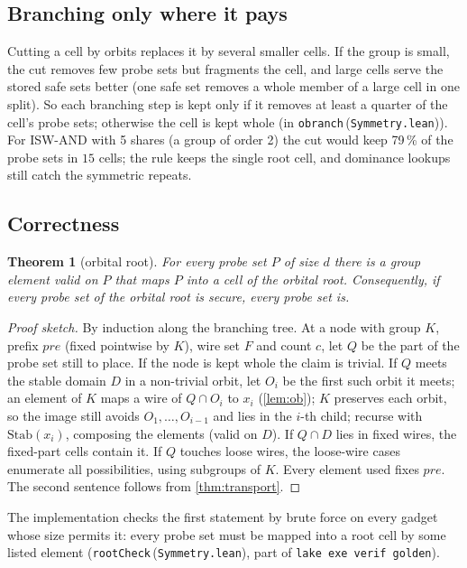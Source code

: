 \documentclass[11pt,a4paper]{article}
\newtheorem{theorem}{Theorem}[section]
\theoremstyle{definition}
\theoremstyle{remark}
\newcommand{\code}[1]{\texttt{\small #1}}
\newcommand{\lean}[2]{\code{#1}\,(\code{#2})}
\newcommand{\Stab}{\mathrm{Stab}}
\begin{document}
\subsection{Branching only where it pays}

Cutting a cell by orbits replaces it by several smaller cells.  If the group is small, the
cut removes few probe sets but fragments the cell, and large cells serve the stored safe sets
better (one safe set removes a whole member of a large cell in one split).  So each branching
step is kept only if it removes at least a quarter of the cell's probe sets; otherwise the
cell is kept whole (in \lean{obranch}{Symmetry.lean}).  For ISW-AND with 5 shares (a group of
order 2) the cut would keep 79\,\% of the probe sets in $15$ cells; the rule keeps the single
root cell, and dominance lookups still catch the symmetric repeats.

\subsection{Correctness}

\begin{theorem}[orbital root]\label{thm:root}
For every probe set $P$ of size $d$ there is a group element valid on $P$ that maps $P$
into a cell of the orbital root.  Consequently, if every probe set of the orbital root is
secure, every probe set is.
\end{theorem}
\begin{proof}[Proof sketch]
By induction along the branching tree.  At a node with group $K$, prefix $\mathit{pre}$
(fixed pointwise by $K$), wire set $F$ and count $c$, let $Q$ be the part of the probe set
still to place.  If the node is kept whole the claim is trivial.  If $Q$ meets the stable
domain $D$ in a non-trivial orbit, let $O_i$ be the first such orbit it meets; an element of
$K$ maps a wire of $Q\cap O_i$ to $x_i$ (\cref{lem:ob}); $K$ preserves each orbit, so the
image still avoids $O_1,\dots,O_{i-1}$ and lies in the $i$-th child; recurse with
$\Stab(x_i)$, composing the elements (valid on $D$).  If $Q\cap D$ lies in fixed wires, the
fixed-part cells contain it.  If $Q$ touches loose wires, the loose-wire cases enumerate all
possibilities, using subgroups of $K$.  Every element used fixes $\mathit{pre}$.  The second
sentence follows from \cref{thm:transport}.
\end{proof}

The implementation checks the first statement by brute force on every gadget whose size
permits it: every probe set must be mapped into a root cell by some listed element
(\lean{rootCheck}{Symmetry.lean}, part of \code{lake exe verif golden}).
\end{document}
